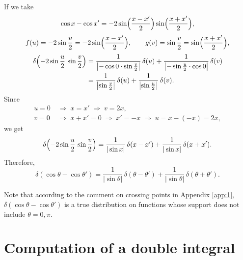 \documentclass[11pt]{article}
\begin{document}
If we take
\[
  \cos x-\cos x'=-2\sin\Bigl(\frac{x-x'}{2}\Bigr)\sin\Bigl(\frac{x+x'}{2}\Bigr),
\]
\[
  f(u)=-2\sin\frac{u}{2}=-2\sin\Bigl(\frac{x-x'}{2}\Bigr),\qquad
  g(v)=\sin\frac{v}{2}=\sin\Bigl(\frac{x+x'}{2}\Bigr),
\]
\begin{align*}
  \delta\Bigl(-2\sin\frac{u}{2}\,\sin\frac{v}{2}\Bigr)
  &=\frac{1}{\bigl|-\cos0\cdot\sin\frac{v}{2}\bigr|}\,\delta(u)
   +\frac{1}{\bigl|-\sin\frac{u}{2}\cdot\cos0\bigr|}\,\delta(v)\\
  &=\frac{1}{\bigl|\sin\frac{v}{2}\bigr|}\,\delta(u)
   +\frac{1}{\bigl|\sin\frac{u}{2}\bigr|}\,\delta(v).
\end{align*}
Since
\begin{align*}
  u=0&\;\Rightarrow\; x=x' \;\Rightarrow\; v=2x,\\
  v=0&\;\Rightarrow\; x+x'=0 \;\Rightarrow\; x'=-x
     \;\Rightarrow\; u=x-(-x)=2x,
\end{align*}
we get
\[
  \delta\Bigl(-2\sin\frac{u}{2}\,\sin\frac{v}{2}\Bigr)
  =\frac{1}{|\sin x|}\,\delta(x-x')+\frac{1}{|\sin x|}\,\delta(x+x').
\]
Therefore,
\begin{equation}\label{eq:deltacos}
  \delta(\cos\theta-\cos\theta')=\frac{1}{|\sin\theta|}\,\delta(\theta-\theta')
  +\frac{1}{|\sin\theta|}\,\delta(\theta+\theta').
\end{equation}

Note that according to the comment on crossing points in Appendix \ref{app:1}, $\delta(\cos\theta-\cos\theta')$ is a true distribution on functions whose support does not include 
$\theta=0, \pi$.


\section{Computation of a double integral}
\label{app:3}
\end{document}

